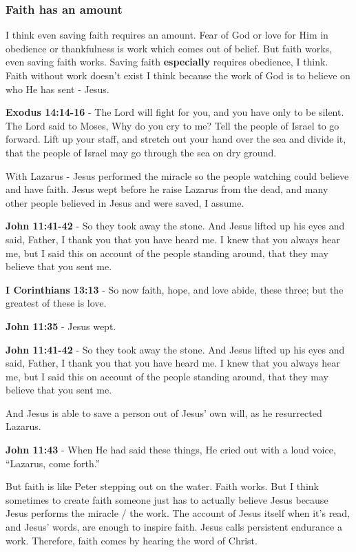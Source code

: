 \documentclass[11pt]{article}
\begin{document}
\subsubsection{Faith has an amount}
\label{sec:org0f1c7c8}
I think even saving faith requires an amount.
Fear of God or love for Him in obedience or thankfulness is work which comes out of belief.
But faith works, even saving faith works. Saving faith \textbf{especially} requires obedience, I think.
Faith without work doesn't exist I think because the work of God is to believe on who He has sent - Jesus.

\textbf{Exodus 14:14-16} - The Lord will fight for you, and you have only to be silent.  The Lord said to Moses, Why do you cry to me? Tell the people of Israel to go forward.  Lift up your staff, and stretch out your hand over the sea and divide it, that the people of Israel may go through the sea on dry ground.

With Lazarus - Jesus performed the miracle so the people watching could believe and have faith.
Jesus wept before he raise Lazarus from the dead, and many other people believed in Jesus and were saved, I assume.

\textbf{John 11:41-42} - So they took away the stone. And Jesus lifted up his eyes and said, Father, I thank you that you have heard me. I knew that you always hear me, but I said this on account of the people standing around, that they may believe that you sent me.

\textbf{I Corinthians 13:13} - So now faith, hope, and love abide, these three; but the greatest of these is love.

\textbf{John 11:35} - Jesus wept.

\textbf{John 11:41-42} - So they took away the stone. And Jesus lifted up his eyes and said, Father, I thank you that you have heard me. I knew that you always hear me, but I said this on account of the people standing around, that they may believe that you sent me.

And Jesus is able to save a person out of Jesus' own will, as he resurrected Lazarus.

\textbf{John 11:43} - When He had said these things, He cried out with a loud voice, “Lazarus, come forth.”

But faith is like Peter stepping out on the water. Faith works. But I think sometimes to create faith someone just has to actually believe Jesus because Jesus performs the miracle / the work. The account of Jesus itself when it's read, and Jesus' words, are enough to inspire faith. Jesus calls persistent endurance a work. Therefore, faith comes by hearing the word of Christ.
\end{document}
